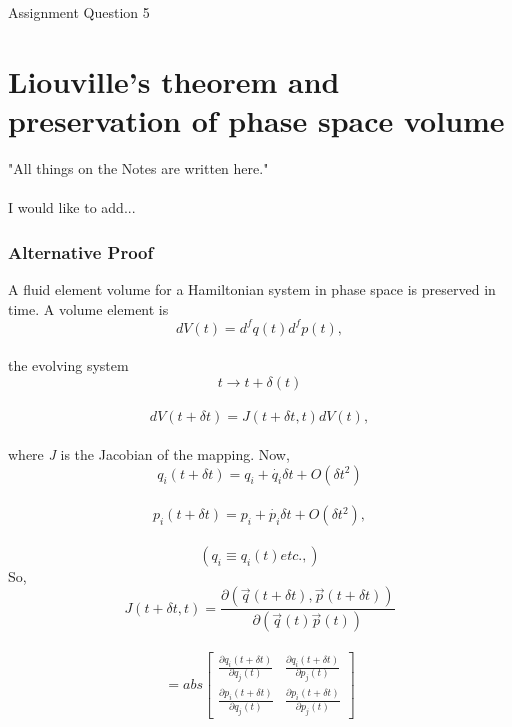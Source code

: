 \documentclass[12pt, letterpaper, oneside, article]{memoir}
\begin{document}
Assignment
Question 5
\vspace{5mm}
\chapter{Liouville's theorem and preservation of phase space volume}
"All things on the Notes are written here."\\
\\
I would like to add...
\subsection{Alternative Proof}
\vspace{5mm}
A fluid element volume for a Hamiltonian system in phase space is preserved in time. A volume element is $$dV(t)=d^fq(t)d^fp(t),$$\\
the evolving system $$t \rightarrow t + \delta (t)$$\\
$$dV(t+\delta t)=J(t+\delta t,t)dV(t),$$\\
where \textit{J} is the Jacobian of the mapping. Now, 
$$q_i(t+\delta t)=q_i+\dot{q_i}\delta t+O(\delta t^2)$$\\
$$p_i(t+\delta t)=p_i+\dot{p_i}\delta t+O(\delta t^2),$$\\

$$(q_i\equiv q_i(t) etc.,)$$ So,\\
$$J(t+\delta t,t)=\frac{\partial(\vec{q}(t+\delta t),\vec{p}(t+\delta t))}{\partial (\vec{q}(t)\vec{p}(t))}$$\\

$$=abs\begin{bmatrix}
\frac{\partial q_i(t+\delta t)}{\partial q_j(t)}&\frac{\partial q_i(t+\delta t)}{\partial p_j(t)}\\
\frac{\partial p_i(t+\delta t)}{\partial q_j(t)}&\frac{\partial p_i(t+\delta t)}{\partial p_j(t)}
\end{bmatrix}
$$\\
\end{document}
